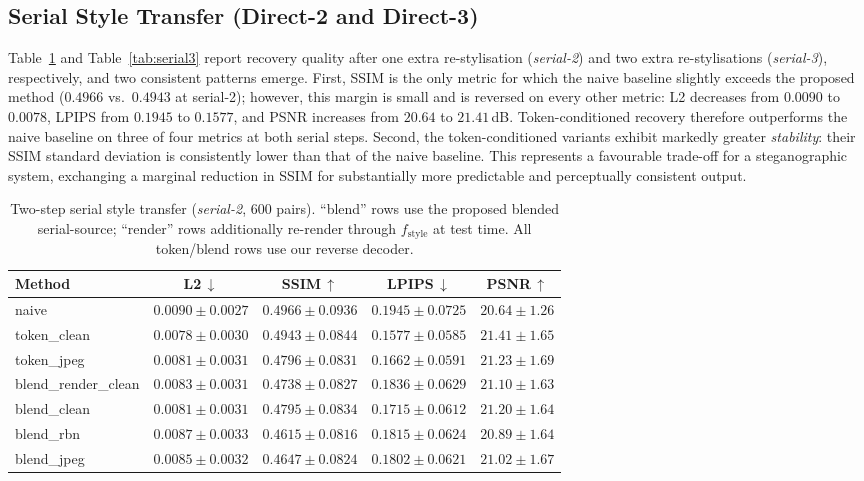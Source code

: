 \documentclass[conference]{IEEEtran}
\begin{document}
\subsection{Serial Style Transfer (Direct-2 and Direct-3)}
\label{sec:exp_serial}
Table~\ref{tab:serial2} and Table~\ref{tab:serial3} report recovery quality after one extra re-stylisation (\emph{serial-2}) and two extra re-stylisations (\emph{serial-3}), respectively, and two consistent patterns emerge. First, SSIM is the only metric for which the naive baseline slightly exceeds the proposed method ($0.4966$ vs.\ $0.4943$ at serial-2); however, this margin is small and is reversed on every other metric: L2 decreases from $0.0090$ to $0.0078$, LPIPS from $0.1945$ to $0.1577$, and PSNR increases from $20.64$ to $21.41$\,dB. Token-conditioned recovery therefore outperforms the naive baseline on three of four metrics at both serial steps. Second, the token-conditioned variants exhibit markedly greater \emph{stability}: their SSIM standard deviation is consistently lower than that of the naive baseline. This represents a favourable trade-off for a steganographic system, exchanging a marginal reduction in SSIM for substantially more predictable and perceptually consistent output.

\begin{table}[t]
\centering
\caption{Two-step serial style transfer (\emph{serial-2}, $600$ pairs). ``blend'' rows use the proposed blended serial-source; ``render'' rows additionally re-render through $f_{\text{style}}$ at test time. All token/blend rows use our reverse decoder.}
\label{tab:serial2}
\setlength{\tabcolsep}{16pt}
\small
\begin{tabular}{lcccc}
\toprule
\textbf{Method} & \textbf{L2}\,$\downarrow$ & \textbf{SSIM}\,$\uparrow$ & \textbf{LPIPS}\,$\downarrow$ & \textbf{PSNR}\,$\uparrow$ \\
\midrule
naive                & $0.0090\pm0.0027$ & $0.4966\pm0.0936$ & $0.1945\pm0.0725$ & $20.64\pm1.26$ \\
\rowcolor{rowshade}
token\_clean          & $\mathbf{0.0078\pm0.0030}$ & $0.4943\pm0.0844$ & $\mathbf{0.1577\pm0.0585}$ & $\mathbf{21.41\pm1.65}$ \\
token\_jpeg           & $0.0081\pm0.0031$ & $0.4796\pm0.0831$ & $0.1662\pm0.0591$ & $21.23\pm1.69$ \\
\rowcolor{rowshade}
blend\_render\_clean  & $0.0083\pm0.0031$ & $0.4738\pm0.0827$ & $0.1836\pm0.0629$ & $21.10\pm1.63$ \\
blend\_clean          & $0.0081\pm0.0031$ & $0.4795\pm0.0834$ & $0.1715\pm0.0612$ & $21.20\pm1.64$ \\
\rowcolor{rowshade}
blend\_rbn            & $0.0087\pm0.0033$ & $0.4615\pm0.0816$ & $0.1815\pm0.0624$ & $20.89\pm1.64$ \\
blend\_jpeg           & $0.0085\pm0.0032$ & $0.4647\pm0.0824$ & $0.1802\pm0.0621$ & $21.02\pm1.67$ \\
\bottomrule
\end{tabular}
\end{table}
\end{document}
